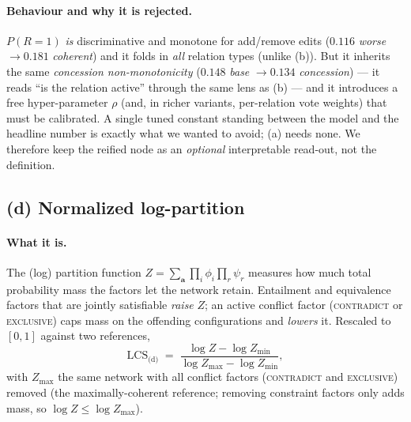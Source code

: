 \documentclass[11pt]{article}
\begin{document}
\paragraph{Behaviour and why it is rejected.} $P(R{=}1)$ \emph{is} discriminative and
monotone for add/remove edits ($0.116$ \emph{worse} $\to 0.181$ \emph{coherent}) and it
folds in \emph{all} relation types (unlike (b)). But it inherits the same
\emph{concession non-monotonicity} ($0.148$ \emph{base} $\to 0.134$ \emph{concession}) --- it
reads ``is the relation active'' through the same lens as (b) --- and it introduces a free
hyper-parameter $\rho$ (and, in richer variants, per-relation vote weights) that must be
calibrated. A single tuned constant standing between the model and the headline number is
exactly what we wanted to avoid; (a) needs none. We therefore keep the reified node as an
\emph{optional} interpretable read-out, not the definition.

\subsection{(d) Normalized log-partition}
\label{sec:logz}

\paragraph{What it is.} The (log) partition function $Z=\sum_{\mathbf a}\prod_i\phi_i\prod_r\psi_r$
measures how much total probability mass the factors let the network retain. Entailment and
equivalence factors that are jointly satisfiable \emph{raise} $Z$; an active conflict factor
(\textsc{contradict} or \textsc{exclusive}) caps mass on the offending configurations and
\emph{lowers} it. Rescaled to $[0,1]$ against two references,
\begin{equation}
  \mathrm{LCS}_{\text{(d)}}
  \;=\;
  \frac{\log Z - \log Z_{\min}}{\log Z_{\max}-\log Z_{\min}} ,
  \label{eq:logz}
\end{equation}
with $Z_{\max}$ the same network with all conflict factors (\textsc{contradict} and
\textsc{exclusive}) removed (the maximally-coherent reference; removing constraint factors
only adds mass, so $\log Z\le\log Z_{\max}$).
\end{document}
